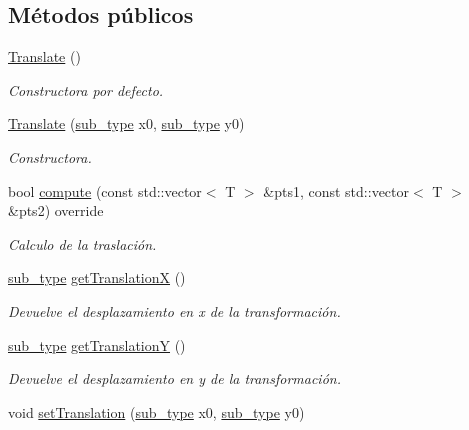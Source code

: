 \subsection*{Métodos públicos}
\begin{DoxyCompactItemize}
\item 
\hyperlink{class_i3_d_1_1_translate_aa65ece5d3be0809aedb1dd05073aa51c}{Translate} ()
\begin{DoxyCompactList}\small\item\em Constructora por defecto. \end{DoxyCompactList}\item 
\hyperlink{class_i3_d_1_1_translate_af75eefcf1cc5dfae68bf6a59dc712884}{Translate} (\hyperlink{class_i3_d_1_1_transform_ac087b4b8b9acb1b11a6caa2231d598c7}{sub\+\_\+type} x0, \hyperlink{class_i3_d_1_1_transform_ac087b4b8b9acb1b11a6caa2231d598c7}{sub\+\_\+type} y0)
\begin{DoxyCompactList}\small\item\em Constructora. \end{DoxyCompactList}\item 
bool \hyperlink{group__trf2_d_group_ga8cab577e50c525caed001caec42a70a6}{compute} (const std\+::vector$<$ T $>$ \&pts1, const std\+::vector$<$ T $>$ \&pts2) override
\begin{DoxyCompactList}\small\item\em Calculo de la traslación. \end{DoxyCompactList}\item 
\hyperlink{class_i3_d_1_1_transform_ac087b4b8b9acb1b11a6caa2231d598c7}{sub\+\_\+type} \hyperlink{class_i3_d_1_1_translate_ae18184337b23daeaf131ce945153b2ef}{get\+TranslationX} ()
\begin{DoxyCompactList}\small\item\em Devuelve el desplazamiento en x de la transformación. \end{DoxyCompactList}\item 
\hyperlink{class_i3_d_1_1_transform_ac087b4b8b9acb1b11a6caa2231d598c7}{sub\+\_\+type} \hyperlink{class_i3_d_1_1_translate_a29f7cc2a3a2060c78c8070175e648b11}{get\+TranslationY} ()
\begin{DoxyCompactList}\small\item\em Devuelve el desplazamiento en y de la transformación. \end{DoxyCompactList}\item 
void \hyperlink{group__trf2_d_group_ga93831181f6cf779c0a7097b348c9c879}{set\+Translation} (\hyperlink{class_i3_d_1_1_transform_ac087b4b8b9acb1b11a6caa2231d598c7}{sub\+\_\+type} x0, \hyperlink{class_i3_d_1_1_transform_ac087b4b8b9acb1b11a6caa2231d598c7}{sub\+\_\+type} y0)

\end{DoxyCompactItemize}
